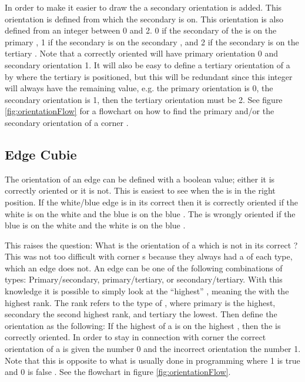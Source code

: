In order to make it easier to draw the \rubik{} a secondary orientation is added. This orientation is defined from which \face{} the secondary \facelet{} is on.
This orientation is also defined from an integer between 0 and 2.
0 if the secondary \facelet{} of the \cubie{} is on the primary \face{}, 1 if the secondary \facelet{} is on the secondary \face{}, and 2 if the secondary \facelet{} is on the tertiary \face{}.
Note that a correctly oriented \cubie{} will have primary orientation 0 and secondary orientation 1.
It will also be easy to define a tertiary orientation of a \cubie{} by where the tertiary \facelet{} is positioned, but this will be redundant since this integer will always have the remaining value, e.g. the primary orientation is 0, the secondary orientation is 1, then the tertiary orientation must be 2.
See figure \ref{fig:orientationFlow} for a flowchart on how to find the primary and/or the secondary orientation of a corner \cubie{}.

\subsection{Edge Cubie}
The orientation of an edge \cubie{} can be defined with a boolean value; either it is correctly oriented or it is not.
This is easiest to see when the \cubie{} is in the right position.
If the white/blue edge \cubie{} is in its correct \cubicle{} then it is correctly oriented if the white \facelet{} is on the white \face{} and the blue \facelet{} is on the blue \face{}.
The \cubie{} is wrongly oriented if the blue \facelet{} is on the white \face{} and the white \facelet{} is on the blue \face{}.

This raises the question: What is the orientation of a \cubie{} which is not in its correct \cubicle{}?
This was not too difficult with corner \cubie{}s because they always had a \facelet{} of each type, which an edge \cubie{} does not. An edge \cubie{} can be one of the following combinations of \facelet{} types: Primary/secondary, primary/tertiary, or secondary/tertiary. With this knowledge it is possible to simply look at the ``highest'' \facelet{}, meaning the \facelet{} with the highest rank.
The rank refers to the type of \facelet{}, where primary is the highest, secondary the second highest rank, and tertiary the lowest.
Then define the orientation as the following: If the highest \facelet{} of a \cubie{} is on the highest \face{}, then the \cubie{} is correctly oriented.
In order to stay in connection with corner \cubie{} the correct orientation of a \cubie{} is given the number 0 and the incorrect orientation the number 1.
Note that this is opposite to what is usually done in programming where 1 is true and 0 is false \cite{boolean2}.
See the flowchart in figure \ref{fig:orientationFlow}.

